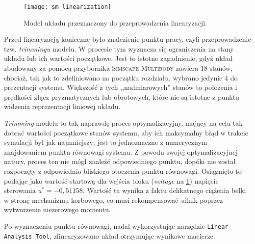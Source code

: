 \begin{figure}[h]
    \centering
    \texttt{[image: sm\_linearization]}
    \caption{Model układu przeznaczony do przeprowadzenia linearyzacji.}
    \label{fig:sm_linearization}
\end{figure}

Przed linearyzacją konieczne było znalezienie punktu pracy, czyli przeprowadzenie tzw. \textit{trimmingu} modelu. W procesie tym wyznacza się ograniczenia na stany układu lub ich wartości początkowe. Jest to istotne zagadnienie, gdyż układ zbudowany za pomocą przybornika \textsc{Simscape Multibody} zawiera \num{18} stanów, chociaż, tak jak to zdefiniowano na początku rozdziału, wybrano jedynie \num{4} do prezentacji systemu. Większość z tych ,,nadmiarowych'' stanów to położenia i prędkości złącz pryzmatycznych lub obrotowych, które nie są istotne z punktu widzenia reprezentacji liniowej układu.

\textit{Trimming} modelu to tak naprawdę proces optymalizacyjny, mający na celu tak dobrać wartości początkowe stanów systemu, aby ich maksymalny błąd w trakcie symulacji był jak najmniejszy; jest to jednoznaczne z numerycznym znajdowaniem punktu równowagi systemu. Z powodu swojej optymalizacyjnej natury, proces ten nie mógł znaleźć odpowiedniego punktu, dopóki nie został rozpoczęty z odpowiednio bliskiego otoczenia punktu równowagi. Osiągnięto to podając jako wartość startową dla wejścia bloku (\textit{voltage} na \cref{fig:sm_linearization}) napięcie sterowania $u^* = -0,51158$. Wartość ta wynika z faktu delikatnego ciążenia belki w stronę mechanizmu korbowego, co musi rekompensować silnik poprzez wytworzenie niezerowego momentu.

Po wyznaczeniu punktu równowagi, nadal wykorzystując narzędzie \texttt{Linear Analysis Tool}, zlinearyzowano układ otrzymując wynikowe macierze:

